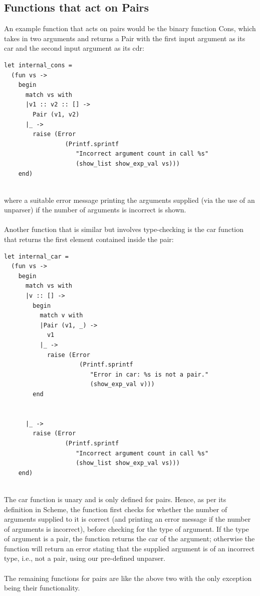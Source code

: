 \subsection{Functions that act on Pairs}
An example function that acts on pairs would be the binary function Cons, which takes in two arguments and returns a Pair with the first input argument as its car and the second input argument as its cdr:
\begin{scriptsize}
\begin{verbatim}
let internal_cons =
  (fun vs ->
    begin
      match vs with
      |v1 :: v2 :: [] ->
        Pair (v1, v2)
      |_ ->
        raise (Error
                 (Printf.sprintf
                    "Incorrect argument count in call %s"
                    (show_list show_exp_val vs)))
    end)
\end{verbatim}
\end{scriptsize}
\\
where a suitable error message printing the arguments supplied (via the use of an unparser) if the number of arguments is incorrect is shown.
\\
\\
Another function that is similar but involves type-checking is the car function that returns the first element contained inside the pair:
\begin{scriptsize}
\begin{verbatim}
let internal_car =
  (fun vs ->
    begin
      match vs with
      |v :: [] ->
        begin
          match v with
          |Pair (v1, _) ->
            v1 
          |_ ->
            raise (Error
                     (Printf.sprintf
                        "Error in car: %s is not a pair."
                        (show_exp_val v)))
        end
       
       
      |_ ->
        raise (Error
                 (Printf.sprintf
                    "Incorrect argument count in call %s"
                    (show_list show_exp_val vs)))
    end)
\end{verbatim}
\end{scriptsize}
\\
The car function is unary and is only defined for pairs. Hence, as per its definition in Scheme, the function first checks for whether the number of arguments supplied to it is correct (and printing an error message if the number 
of arguments is incorrect), before checking for the type of argument. If the type of argument is a pair, the function returns the car of the argument; otherwise the function will return an error stating that the supplied 
argument is of an incorrect type, i.e., not a pair, using our pre-defined unparser.
\\
\\
The remaining functions for pairs are like the above two with the only exception being their functionality.
